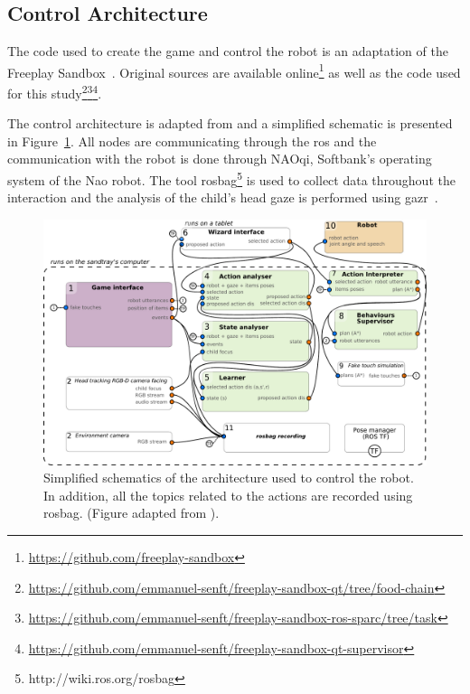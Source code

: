 \subsection{Control Architecture}

The code used to create the game and control the robot is an adaptation of the Freeplay Sandbox~\citep{lemaignan2017free}. Original sources are available online\footnote{\url{https://github.com/freeplay-sandbox}} as well as the code used for this study\footnote{\url{https://github.com/emmanuel-senft/freeplay-sandbox-qt/tree/food-chain}}\footnote{\url{https://github.com/emmanuel-senft/freeplay-sandbox-ros-sparc/tree/task}}\footnote{\url{https://github.com/emmanuel-senft/freeplay-sandbox-qt-supervisor}}.

The control architecture is adapted from \cite{lemaignan2017free} and a simplified schematic is presented in Figure~\ref{fig:tutoring_arch}. All nodes are communicating through the \gls{ros} \citep{quigley2009ros} and the communication with the robot is done through NAOqi, Softbank's operating system of the Nao robot. The tool rosbag\footnote{http://wiki.ros.org/rosbag} is used to collect data throughout the interaction and the analysis of the child's head gaze is performed using gazr~\citep{lemaignan2016real}.

\begin{figure}[ht]
	\centering
	\includegraphics[width=1\textwidth]{architecture.pdf}
	\caption{Simplified schematics of the architecture used to control the robot. In addition, all the topics related to the actions are recorded using rosbag. (Figure adapted from \cite{lemaignan2017free}).}
	\label{fig:tutoring_arch}
\end{figure}

